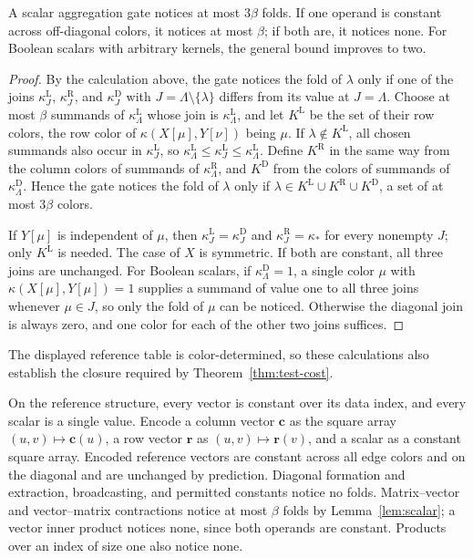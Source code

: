 \begin{lemma}\label{lem:scalar}
A scalar aggregation gate notices at most $3\beta$ folds.
If one operand is constant across off-diagonal colors, it notices
at most $\beta$; if both are, it notices none. For Boolean scalars
with arbitrary kernels, the general bound improves to two.
\end{lemma}
\begin{proof}
By the calculation above, the gate notices the fold of $\lambda$
only if one of the joins $\kappa_J^{\mathrm L}$,
$\kappa_J^{\mathrm R}$, and $\kappa_J^{\mathrm D}$ with
$J=\Lambda\setminus\{\lambda\}$ differs from its value at
$J=\Lambda$. Choose at most $\beta$ summands of
$\kappa_\Lambda^{\mathrm L}$ whose join is
$\kappa_\Lambda^{\mathrm L}$, and let $K^{\mathrm L}$ be the
set of their row colors, the row color of
$\kappa(X[\mu],Y[\nu])$ being $\mu$. If
$\lambda\notin K^{\mathrm L}$, all chosen summands also occur in
$\kappa_J^{\mathrm L}$, so
$\kappa_\Lambda^{\mathrm L}\le
\kappa_J^{\mathrm L}\le\kappa_\Lambda^{\mathrm L}$.
Define $K^{\mathrm R}$ in the same way from the column colors of
summands of $\kappa_\Lambda^{\mathrm R}$, and $K^{\mathrm D}$
from the colors of summands of $\kappa_\Lambda^{\mathrm D}$.
Hence the gate notices the fold of $\lambda$ only if
$\lambda\in K^{\mathrm L}\cup K^{\mathrm R}\cup K^{\mathrm D}$,
a set of at most $3\beta$ colors.

If $Y[\mu]$ is independent of $\mu$, then
$\kappa_J^{\mathrm L}=\kappa_J^{\mathrm D}$ and
$\kappa_J^{\mathrm R}=\kappa_*$ for every nonempty $J$;
only $K^{\mathrm L}$ is needed. The case of $X$ is symmetric.
If both are constant, all three joins are unchanged.
For Boolean scalars, if $\kappa_\Lambda^{\mathrm D}=1$, a single
color $\mu$ with $\kappa(X[\mu],Y[\mu])=1$ supplies a summand
of value one to all three joins whenever $\mu\in J$, so only the
fold of $\mu$ can be noticed. Otherwise the diagonal join is
always zero, and one color for each of the other two joins suffices.
\end{proof}
The displayed reference table is color-determined, so these
calculations also establish the closure required by
Theorem~\ref{thm:test-cost}.

On the reference structure, every vector is constant over its data
index, and every scalar is a single value. Encode a column vector
$\mathbf c$ as the square array $(u,v)\mapsto\mathbf c(u)$,
a row vector $\mathbf r$ as $(u,v)\mapsto\mathbf r(v)$, and a
scalar as a constant square array. Encoded reference vectors are
constant across all edge colors and on the diagonal and are
unchanged by prediction. Diagonal formation and extraction,
broadcasting, and permitted constants notice no folds.
Matrix--vector and vector--matrix contractions notice at most
$\beta$ folds by Lemma~\ref{lem:scalar}; a vector inner product
notices none, since both operands are constant.
Products over an index of size one also notice none.

